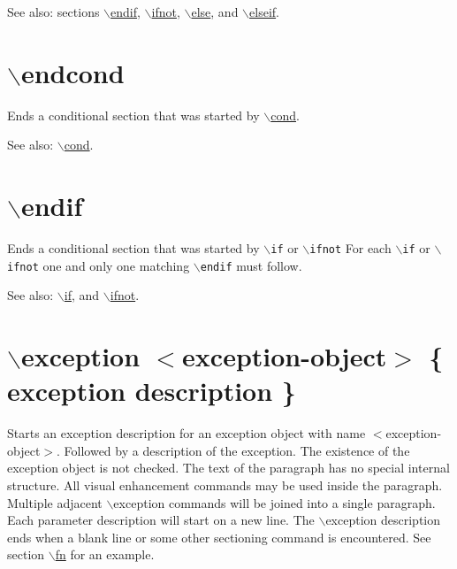 \begin{Desc}
\item[See also:]sections \hyperlink{commands_cmdendif}{$\backslash$endif}, \hyperlink{commands_cmdifnot}{$\backslash$ifnot}, \hyperlink{commands_cmdelse}{$\backslash$else}, and \hyperlink{commands_cmdelseif}{$\backslash$elseif}.\end{Desc}


 \hypertarget{commands_cmdendcond}{}\section{$\backslash$endcond}\label{commands_cmdendcond}
 Ends a conditional section that was started by \hyperlink{commands_cmdcond}{$\backslash$cond}.

\begin{Desc}
\item[See also:]\hyperlink{commands_cmdcond}{$\backslash$cond}.\end{Desc}


 \hypertarget{commands_cmdendif}{}\section{$\backslash$endif}\label{commands_cmdendif}
 Ends a conditional section that was started by {\tt $\backslash$if} or {\tt $\backslash$ifnot} For each {\tt $\backslash$if} or {\tt $\backslash$ifnot} one and only one matching {\tt $\backslash$endif} must follow.

\begin{Desc}
\item[See also:]\hyperlink{commands_cmdif}{$\backslash$if}, and \hyperlink{commands_cmdifnot}{$\backslash$ifnot}.\end{Desc}


 \hypertarget{commands_cmdexception}{}\section{$\backslash$exception $<$exception-object$>$ \{ exception description \}}\label{commands_cmdexception}
 Starts an exception description for an exception object with name $<$exception-object$>$. Followed by a description of the exception. The existence of the exception object is not checked. The text of the paragraph has no special internal structure. All visual enhancement commands may be used inside the paragraph. Multiple adjacent $\backslash$exception commands will be joined into a single paragraph. Each parameter description will start on a new line. The $\backslash$exception description ends when a blank line or some other sectioning command is encountered. See section \hyperlink{commands_cmdfn}{$\backslash$fn} for an example.

